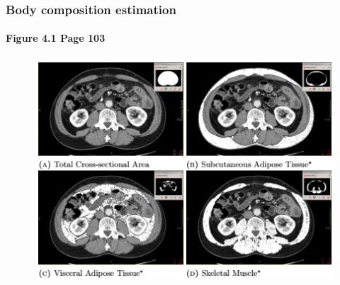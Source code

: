\documentclass[10pt]{beamer}
\begin{document}
\begin{frame}
	\frametitle{Body composition estimation}
	\framesubtitle{Figure 4.1 Page 103}
	\begin{figure}
		\centering
		\includegraphics[width=\linewidth]{bc_gimp}
		\label{fig:bc_gimp}
	\end{figure}
\end{frame}
\end{document}
